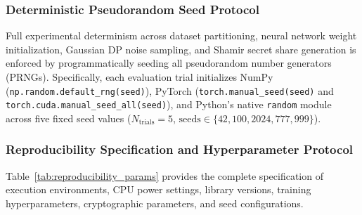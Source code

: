 \subsubsection{Deterministic Pseudorandom Seed Protocol}
Full experimental determinism across dataset partitioning, neural network weight initialization, Gaussian DP noise sampling, and Shamir secret share generation is enforced by programmatically seeding all pseudorandom number generators (PRNGs). Specifically, each evaluation trial initializes NumPy (\texttt{np.random.default\_rng(seed)}), PyTorch (\texttt{torch.manual\_seed(seed)} and \texttt{torch.cuda.manual\_seed\_all(seed)}), and Python's native \texttt{random} module across five fixed seed values ($N_{\text{trials}}=5$, $\text{seeds} \in \{42, 100, 2024, 777, 999\}$).

\subsubsection{Reproducibility Specification and Hyperparameter Protocol}
Table~\ref{tab:reproducibility_params} provides the complete specification of execution environments, CPU power settings, library versions, training hyperparameters, cryptographic parameters, and seed configurations.

